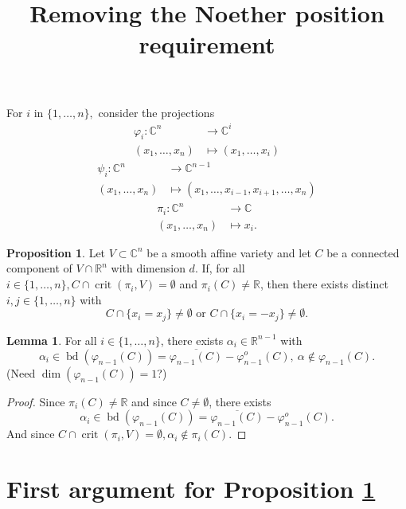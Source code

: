 \documentclass[11pt]{article}
\title{Removing the Noether position requirement}
\author{}
\date{}
\theoremstyle{definition}
\newtheorem{proposition}{Proposition}
\newtheorem{lemma}{Lemma}
\newcommand{\C}{\mathbb{C}}
\newcommand{\R}{\mathbb{R}}
\newcommand{\vp}{\varphi}
\DeclareMathOperator{\bd}{bd}
\DeclareMathOperator{\crit}{crit}
\begin{document}
\maketitle

\noindent 
For $i$ in
$\{1,\dots,n\},$ consider the projections
\begin{align*}
    \vp_i: \C^n  &\rightarrow \C^i \\
    (x_1,\hdots,x_n) &\mapsto  (x_1,\hdots,x_i)    
\end{align*}
\begin{align*}
    \psi_i: \C^n  &\rightarrow \C^{n-1} \\
    (x_1,\hdots,x_n) &\mapsto  (x_1,\hdots,x_{i-1},x_{i+1},\hdots,x_n)    
\end{align*}
\begin{align*}
    \pi_i: \C^n  &\rightarrow \C \\
    (x_1,\hdots,x_n) &\mapsto x_i.
\end{align*}
%
\begin{proposition}\label{prop:main}
    Let $V \subset \C^n$ be a smooth affine variety and let $C$ be a connected component of $V \cap \R^n$ with dimension $d$. If, for all $i \in \{1,\hdots,n\}, C \cap \crit(\pi_i,V) = \emptyset$  and  $\pi_i(C) \not = \R$, then there exists distinct $i,j \in\{1,\hdots,n\}$ with
    \[
C \cap \{ x_i= x_j\} \not = \emptyset \textrm{ or }
C \cap \{ x_i= -x_j\} \not = \emptyset. 
    \]
\end{proposition}
%
\begin{lemma}\label{lemma:limitPoint}
    For all $i \in \{1,\hdots,n\}$, there exists  $\alpha_i \in \R^{n-1}$ with 
    \[
\alpha_i \in \bd(\vp_{n-1}(C)) = \overline{\vp_{n-1}(C)} - \vp_{n-1}^o(C), ~\alpha \not \in \vp_{n-1}(C).
    \]
    \color{red}(Need $\dim(\vp_{n-1}(C))=1$?)\color{black}
\end{lemma}
\begin{proof}
Since $\pi_i(C) \not = \R$ and since $C \not = \emptyset$, there exists 
\[
\alpha_i \in \bd(\vp_{n-1}(C)) = \overline{\vp_{n-1}(C)} - \vp_{n-1}^o(C).
\]
And since $C \cap \crit(\pi_i,V) = \emptyset, \alpha_i \not \in \pi_i(C).$
\end{proof}
%




\section*{First argument for Proposition \ref{prop:main}}
\end{document}
